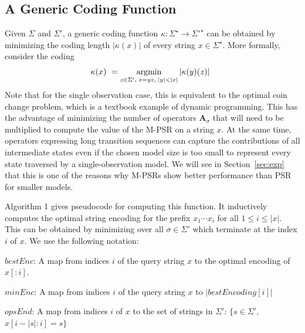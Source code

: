 \documentclass[letterpaper]{article}
\newcommand{\mat}[1]{\mathbf{#1}}
\newcommand{\A}{\mat{A}}
\newcommand{\sstar}{\Sigma^\star}
\DeclareMathOperator*{\argmin}{\rm argmin}
\begin{document}
\subsection{A Generic Coding Function}

Given $\Sigma$ and $\Sigma'$, a generic coding function $\kappa : \sstar \to {\Sigma'}^\star$ can be obtained by minimizing the coding length $|\kappa(x)|$ of every string $x \in \sstar$. More formally, consider the coding
\begin{equation*}
\kappa(x) ~= \argmin_{ z \in \Sigma', \; x=yz, \; |y|<|x|} |\kappa(y)(z)| \enspace 
\end{equation*}
Note that for the single observation case, this is equivalent to the optimal coin change problem, which is a textbook example of dynamic programming. This has the advantage of minimizing the number of operators $\A_\sigma$ that will need to be multiplied to compute the value of the M-PSR on a string $x$. At the same time, operators expressing long transition sequences can capture the contributions of all intermediate states even if the chosen model size is too small to represent every state traversed by a single-observation model. We will see in Section~\ref{sec:exp} that this is one of the reasons why M-PSRs show better performance than PSR for smaller models.

Algorithm 1 gives pseudocode for computing this function. It inductively computes the optimal string encoding for the prefix $x_1 \cdots x_i$ for all $1 \leq i \leq |x|$. This can be obtained by minimizing over all $\sigma \in \Sigma'$ which terminate at the index $i$ of $x$.
We use the following notation:

$bestEnc$: A map from indices $i$ of the query string $x$ to the optimal encoding of $x[:i]$.

$minEnc$: A map from indices $i$ of the query string $x$ to $|bestEncoding[i]|$

$opsEnd$: A map from indices $i$ of $x$ to the set of strings in $\Sigma'$: $\{s \in \Sigma',$ $x[i-|s|:i] = s\}$

\algnewcommand{}
\algnewcommand{}

\algnewcommand\INPUT{\item[\algorithmicinput]}
\algnewcommand\OUTPUT{\item[\algorithmicoutput]}
\end{document}
